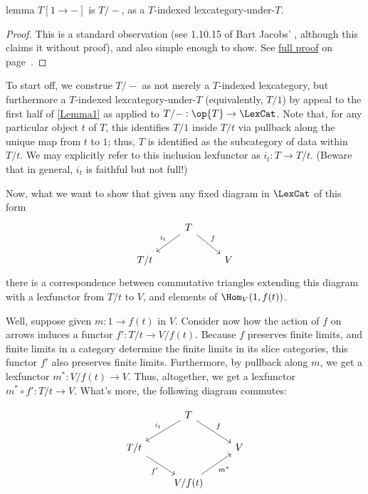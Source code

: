 \begin{theoremEnd}[category=IntrospLemmas]{lemma}\label{Lemma2}
$T[1 \to -]$ is $T/-$, as a $T$-indexed lexcategory-under-$T$.
\end{theoremEnd}
\begin{proof}
This is a standard observation (see 1.10.15 of Bart Jacobs' , although this claims it without proof), and also simple enough to show. See \hyperref[proof:prAtEnd\pratendcountercurrent]{full proof} on page~\pageref{proof:prAtEnd\pratendcountercurrent}.
\end{proof}
\begin{proofEnd}
To start off, we construe $T/-$ as not merely a $T$-indexed lexcategory, but furthermore a $T$-indexed lexcategory-under-$T$ (equivalently, $T/1$) by appeal to the first half of \cref{Lemma1} as applied to $T/- : \op{T} \to \LexCat$. Note that, for any particular object $t$ of $T$, this identifies $T/1$ inside $T/t$ via pullback along the unique map from $t$ to $1$; thus, $T$ is identified as the subcategory of  data within $T/t$. We may explicitly refer to this inclusion lexfunctor as $i_t : T \to T/t$. (Beware that in general, $i_t$ is faithful but not full!)

Now, what we want to show that given any fixed diagram in $\LexCat$ of this form
\[\begin{tikzcd}
	& T \\
	{T/t} && V
	\arrow["{i_t}"', from=1-2, to=2-1]
	\arrow["f", from=1-2, to=2-3]
\end{tikzcd}\]
there is a correspondence between commutative triangles extending this diagram with a lexfunctor from $T/t$ to $V$, and elements of $\Hom_V(1, f(t))$.

Well, suppose given $m : 1 \to f(t)$ in $V$. Consider now how the action of $f$ on arrows induces a functor $f' : T/t \to V/f(t)$. Because $f$ preserves finite limits, and finite limits in a category determine the finite limits in its slice categories, this functor $f'$ also preserves finite limits. Furthermore, by pullback along $m$, we get a lexfunctor $m^* : V/f(t) \to V$. Thus, altogether, we get a lexfunctor $m^* \circ f' : T/t \to V$. What's more, the following diagram commutes:

\[\begin{tikzcd}
	& T \\
	{T/t} && V \\
	& {V/f(t)}
	\arrow["{i_t}"', from=1-2, to=2-1]
	\arrow["f", from=1-2, to=2-3]
	\arrow["{f'}"', from=2-1, to=3-2]
	\arrow["{m^*}"', from=3-2, to=2-3]
\end{tikzcd}\]


\end{proofEnd}
